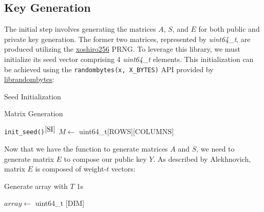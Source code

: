 \subsection{Key Generation}
The initial step involves generating the matrices \(A\), \(S\), and \(E\) for both public and private key generation. The former two matrices, represented by \textit{uint64\_t}, are produced utilizing the \href{https://prng.di.unimi.it}{xoshiro256} PRNG. To leverage this library, we must initialize its seed vector comprising 4 \textit{uint64\_t} elements. This initialization can be achieved using the \texttt{randombytes(x, X\_BYTES)} API provided by \href{https://randombytes.cr.yp.to/index.html}{librandombytes}:
\begin{algorithm}[H]
\DontPrintSemicolon
\caption{Seed Initialization}
\label{SI}
\end{algorithm}
\begin{algorithm}[H]
\DontPrintSemicolon
\caption{Matrix Generation}
\label{GAS}
\texttt{init\_seed()}$^{\ref{SI}}$\;
$M \leftarrow$ uint64\_t[ROWS][COLUMNS]\;
\;
\end{algorithm}

Now that we have the function to generate matrices \(A\) and \(S\), we need to generate matrix \(E\) to compose our public key \(Y\). As described by Alekhnovich, matrix \(E\) is composed of weight-\(t\) vectors:

\begin{algorithm}[H]
\DontPrintSemicolon
\caption{Generate array with \(T\) 1s}
\label{GA}
\label{FB}
$array \leftarrow$ uint64\_t [DIM]\;
\end{algorithm}

